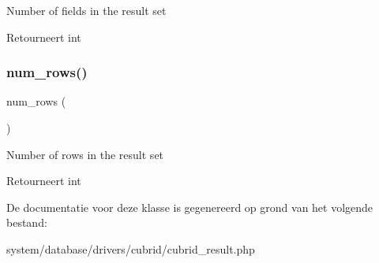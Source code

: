 Number of fields in the result set

\begin{DoxyReturn}{Retourneert}
int 
\end{DoxyReturn}
\mbox{\label{class_c_i___d_b__cubrid__result_a218657c303ee499b97710ab0cd2f5d6e}} 
\subsubsection{\texorpdfstring{num\_rows()}{num\_rows()}}
{\footnotesize\ttfamily num\+\_\+rows (\begin{DoxyParamCaption}{ }\end{DoxyParamCaption})}

Number of rows in the result set

\begin{DoxyReturn}{Retourneert}
int 
\end{DoxyReturn}


De documentatie voor deze klasse is gegenereerd op grond van het volgende bestand\+:\begin{DoxyCompactItemize}
\item 
system/database/drivers/cubrid/cubrid\+\_\+result.\+php\end{DoxyCompactItemize}
